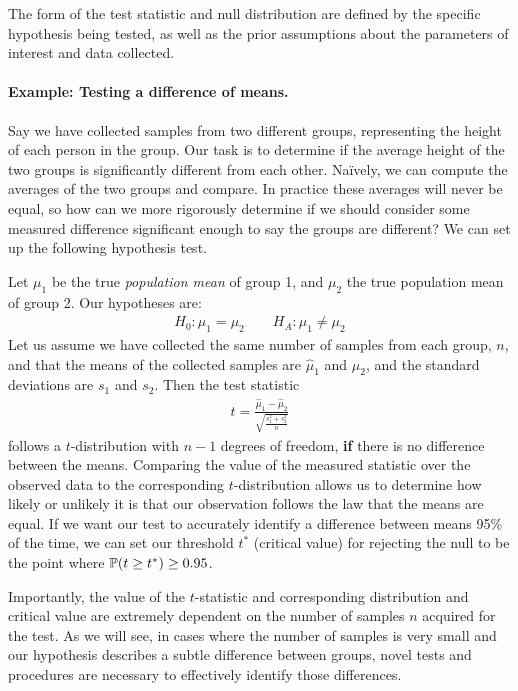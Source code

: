 The form of the test statistic and null distribution
are defined by the specific hypothesis being tested,
as well as the prior assumptions about the parameters
of interest and data collected.

\paragraph{Example: Testing a difference of means.} 
Say we have collected samples from two different groups,
representing the height of each person in the group.
Our task is to determine if the average height
of the two groups is significantly different from each other.
Na\"ively, we can compute the averages of the two groups and compare.
In practice these averages will never be equal, so how can we 
more rigorously determine if we should consider some measured difference
significant enough to say the groups are different?
We can set up the following hypothesis test.

Let $\mu_1$ be the true \textit{population mean} of group 1,
and $\mu_2$ the true population mean of group 2.
Our hypotheses are:
\begin{align}
H_0: \mu_1 = \mu_2 \qquad H_A: \mu_1 \neq \mu_2
\end{align}
Let us assume we have collected the same number of samples from each group,
$n$, and that the means of the collected samples are $\hat{\mu}_1$ and $\hat{\mu}_2$,
and the standard deviations are $s_1$ and $s_2$.
Then the test statistic
\begin{align}
t = \frac{\hat{\mu}_1 - \hat{\mu}_2}{\sqrt{\frac{s_1^2 + s_2^2}{n}}}
\end{align}
follows a $t$-distribution with $n-1$ degrees of freedom,
\textbf{if} there is no difference between the means.
Comparing the value of the measured statistic over the observed data
to the corresponding $t$-distribution allows
us to determine how likely or unlikely it is that 
our observation follows the law that the means are equal.
If we want our test to accurately identify
a difference between means 95\% of the time,
we can set our threshold $t^*$ (critical value) for rejecting the null
to be the point where $\mathbb{P}(t \geq t^*) \geq 0.95$.

Importantly, the value of the $t$-statistic and corresponding
distribution and critical value are extremely
dependent on the number of samples $n$ acquired for the test.
As we will see, in cases where the number of samples is 
very small and our hypothesis describes 
a subtle difference between groups,
novel tests and procedures are necessary
to effectively identify those differences.

